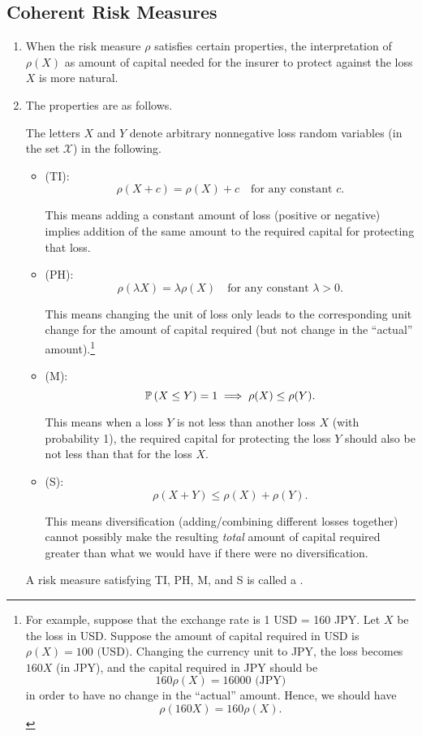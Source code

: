 \subsection{Coherent Risk Measures}
\label{subsect:coherent-risk-measures}
\begin{enumerate}
\item When the risk measure \(\rho\) satisfies certain properties, the
interpretation of \(\rho(X)\) as amount of capital needed for the insurer to
protect against the loss \(X\) is more natural.
\item The properties are as follows. \begin{note}
The letters \(X\) and \(Y\) denote arbitrary nonnegative loss random variables
(in the set \(\mathcal{X}\)) in the following.
\end{note}
\begin{itemize}
\item {} (TI):
\[
\rho(X+c)=\rho(X)+c\quad\text{for any constant \(c\)}.
\]
\begin{note}
This means adding a constant amount of loss (positive or negative) implies
addition of the same amount to the required capital for protecting that loss.
\end{note}
\item {} (PH):
\[
\rho(\lambda X)=\lambda\rho(X)\quad\text{for any constant \(\lambda>0\)}.
\]
\begin{note}
This means changing the unit of loss only leads to the corresponding unit
change for the amount of capital required (but not change in the ``actual''
amount).\footnote{For example, suppose that the exchange rate is 1 USD = 160
JPY. Let \(X\) be the loss in USD. Suppose the amount of capital required in
USD is \(\rho(X)=100\text{ (USD)}\).  Changing the currency unit to JPY, the
loss becomes \(160X\) (in JPY), and the capital required in JPY should be
\[
160\rho(X)=16000\text{ (JPY)}
\]
in order to have no change in the ``actual'' amount. Hence, we should have
\[
\rho(160X)=160\rho(X).
\]}
\end{note}
\item {} (M):
\[
\mathbb{P}\left(X\le Y\right)=1\implies \rho(X)\le\rho(Y).
\]
\begin{note}
This means when a loss \(Y\) is not less than another loss \(X\) (with
probability 1), the required capital for protecting the loss \(Y\) should also
be not less than that for the loss \(X\).
\end{note}
\item {} (S):
\[
\rho(X+Y)\le\rho(X)+\rho(Y).
\]
\begin{note}
This means diversification (adding/combining different losses together) cannot
possibly make the resulting \emph{total} amount of capital required greater
than what we would have if there were no diversification.
\end{note}
\end{itemize}
A risk measure satisfying TI, PH, M, and S is called a .


\end{enumerate}
